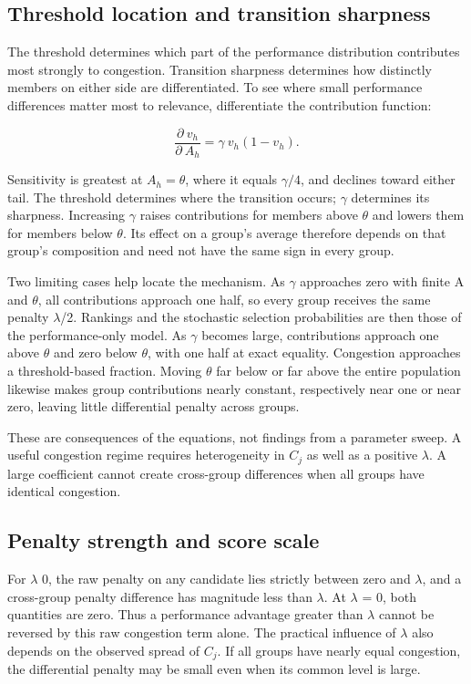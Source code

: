 \subsection{Threshold location and transition sharpness}\label{threshold-location-and-transition-sharpness}

The threshold determines which part of the performance distribution contributes most strongly to congestion. Transition sharpness determines how distinctly members on either side are differentiated. To see where small performance differences matter most to relevance, differentiate the contribution function:

\[
\frac{\partial\ v_{h}}{\partial\ A_{h}} = \gamma\ v_{h}(1 - v_{h}).
\]

Sensitivity is greatest at \(A_{h} = \theta\), where it equals \(\gamma/4\), and declines toward either tail. The threshold determines where the transition occurs; \(\gamma\) determines its sharpness. Increasing \(\gamma\) raises contributions for members above \(\theta\) and lowers them for members below \(\theta\). Its effect on a group's average therefore depends on that group's composition and need not have the same sign in every group.

Two limiting cases help locate the mechanism. As \(\gamma\) approaches zero with finite A and \(\theta\), all contributions approach one half, so every group receives the same penalty \(\lambda\)/2. Rankings and the stochastic selection probabilities are then those of the performance-only model. As \(\gamma\) becomes large, contributions approach one above \(\theta\) and zero below \(\theta\), with one half at exact equality. Congestion approaches a threshold-based fraction. Moving \(\theta\) far below or far above the entire population likewise makes group contributions nearly constant, respectively near one or near zero, leaving little differential penalty across groups.

These are consequences of the equations, not findings from a parameter sweep. A useful congestion regime requires heterogeneity in \(C_{j}\) as well as a positive \(\lambda\). A large coefficient cannot create cross-group differences when all groups have identical congestion.

\subsection{Penalty strength and score scale}\label{penalty-strength-and-score-scale}

For \(\lambda\) 0, the raw penalty on any candidate lies strictly between zero and \(\lambda\), and a cross-group penalty difference has magnitude less than \(\lambda\). At \(\lambda\) = 0, both quantities are zero. Thus a performance advantage greater than \(\lambda\) cannot be reversed by this raw congestion term alone. The practical influence of \(\lambda\) also depends on the observed spread of \(C_{j}\). If all groups have nearly equal congestion, the differential penalty may be small even when its common level is large.

